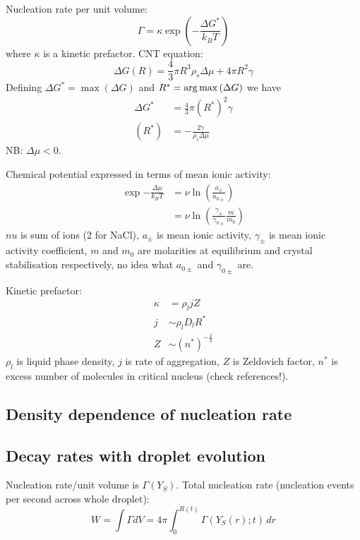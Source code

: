 \documentclass[12pt]{report}
\begin{document}
Nucleation rate per unit volume:
\begin{equation}
  \Gamma = \kappa \exp{\left(-\frac{\Delta G^{*}}{k_B T}\right)}
\end{equation}
where $\kappa$ is a kinetic prefactor.
CNT equation:
\begin{equation}
  \Delta G(R) = \frac{4}{3} \pi R^3 \rho_s \Delta \mu + 4\pi R^2 \gamma
\end{equation}
Defining $\Delta G^{*} = \max{(\Delta G)}$ and $R^{*} = \operatorname*{arg\,max}{(\Delta G)}$ we have
\begin{align}
  \Delta G^{*} &= \frac{4}{3} \pi (R^{*})^2 \gamma \\
  (R^{*}) &= -\frac{2\gamma}{\rho_s \Delta\mu}
\end{align}
NB: $\Delta \mu < 0$.

Chemical potential expressed in terms of mean ionic activity:
\begin{equation}
  \begin{aligned}
  \exp{-\frac{\Delta \mu}{k_B T}} &=
  \nu \ln{\left( \frac{a_\pm}{a_{0\pm}} \right)} \\
  &=
  \nu \ln{\left( \frac{\gamma_\pm}{\gamma_{0\pm}} \frac{m}{m_0} \right)}
  \end{aligned}
\end{equation}
$nu$ is sum of ions (2 for NaCl), $a_\pm$ is mean ionic activity, $\gamma_\pm$ is mean ionic activity coefficient, $m$ and $m_0$ are molarities at equilibrium and crystal stabilisation respectively, no idea what $a_{0\pm}$ and $\gamma_{0\pm}$ are.

Kinetic prefactor:
\begin{align}
  \kappa &= \rho_l j Z \\
  j &\sim \rho_l D_l R^* \\
  Z &\sim (n^*)^{-\tfrac{2}{3}}
\end{align}
$\rho_l$ is liquid phase density, $j$ is rate of aggregation, $Z$ is Zeldovich factor, $n^*$ is excess number of molecules in critical nucleus (check references!).

\subsection{Density dependence of nucleation rate}
\subsection{Decay rates with droplet evolution}

Nucleation rate/unit volume is $\Gamma(Y_S)$.
Total nucleation rate (nucleation events per second across whole droplet):
\begin{equation}
  W = \int \Gamma dV
  = 4\pi \int_0^{R(t)} \Gamma(Y_S(r); t) \, dr
\end{equation}
\end{document}
